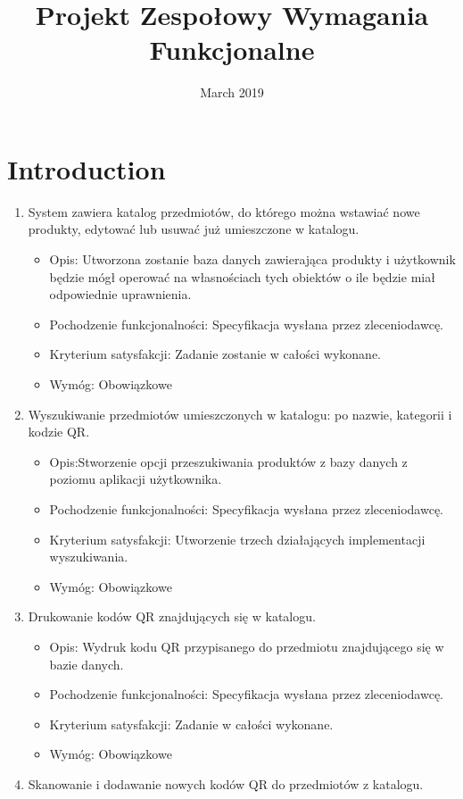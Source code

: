 \documentclass{article}
\title{Projekt Zespołowy Wymagania  Funkcjonalne}
\author{ }
\date{March 2019}
\begin{document}
\maketitle

\section{Introduction}
\begin{enumerate}
\item System zawiera katalog przedmiotów, do którego można wstawiać nowe produkty, edytować lub usuwać już umieszczone w katalogu.
\begin{itemize}
\item Opis: Utworzona zostanie baza danych zawierająca produkty i użytkownik będzie mógł operować na własnościach tych obiektów o ile będzie miał odpowiednie uprawnienia.
\item Pochodzenie funkcjonalności: Specyfikacja wysłana przez zleceniodawcę. 
\item Kryterium satysfakcji: Zadanie zostanie w całości wykonane.
\item Wymóg: Obowiązkowe
\end{itemize}
\item Wyszukiwanie przedmiotów umieszczonych w katalogu: po nazwie, kategorii i kodzie QR.
\begin{itemize}
\item Opis:Stworzenie opcji przeszukiwania produktów z bazy danych z poziomu aplikacji użytkownika. 
\item Pochodzenie funkcjonalności: Specyfikacja wysłana przez zleceniodawcę. 
\item Kryterium satysfakcji: Utworzenie trzech działających implementacji wyszukiwania. 
\item Wymóg: Obowiązkowe
\end{itemize}
\item Drukowanie kodów QR znajdujących się w katalogu.
\begin{itemize}
\item Opis: Wydruk kodu QR przypisanego do przedmiotu znajdującego się w bazie danych. 
\item Pochodzenie funkcjonalności: Specyfikacja wysłana przez zleceniodawcę. 
\item Kryterium satysfakcji: Zadanie w całości wykonane.
\item Wymóg: Obowiązkowe
\end{itemize}
\item Skanowanie i dodawanie nowych kodów QR do przedmiotów z katalogu.

\end{enumerate}
\end{document}
